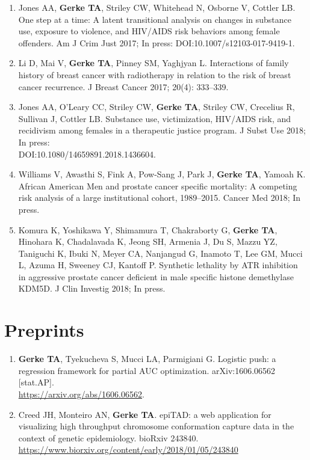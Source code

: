 \documentclass[11pt, a4paper]{article} %
\begin{document}
\begin{enumerate}[leftmargin=*]
\item{} Jones AA, {\bf Gerke TA}, Striley CW, Whitehead N, Osborne V, Cottler LB. One step at a time: A latent transitional analysis on changes in substance use, exposure to violence, and HIV/AIDS risk behaviors among female offenders. Am J Crim Just 2017; In press: DOI:10.1007/s12103-017-9419-1.

\item{} Li D, Mai V, {\bf Gerke TA}, Pinney SM, Yaghjyan L. Interactions of family history of breast cancer with radiotherapy in relation to the risk of breast cancer recurrence. J Breast Cancer 2017; 20(4): 333--339.

\item{} Jones AA, O'Leary CC, Striley CW, {\bf Gerke TA}, Striley CW, Crecelius R, Sullivan J, Cottler LB. Substance use, victimization, HIV/AIDS risk, and recidivism among females in a therapeutic justice program. J Subst Use 2018; In press:\\DOI:10.1080/14659891.2018.1436604.

\item{} Williams V, Awasthi S, Fink A, Pow-Sang J, Park J, {\bf Gerke TA}, Yamoah K. African American Men and prostate cancer specific mortality: A competing risk analysis of a large institutional cohort, 1989--2015. Cancer Med 2018; In press. 

\item{} Komura K, Yoshikawa Y, Shimamura T, Chakraborty G, {\bf Gerke TA}, Hinohara K, Chadalavada K, Jeong SH,  Armenia J, Du S, Mazzu YZ, Taniguchi K, Ibuki N, Meyer CA, Nanjangud G, Inamoto T, Lee GM, Mucci L, Azuma H, Sweeney CJ, Kantoff P. Synthetic lethality by ATR inhibition in aggressive prostate cancer deficient in male specific histone demethylase KDM5D. J Clin Investig 2018; In press. 
\end{enumerate}

\section*{Preprints}
\begin{enumerate}[leftmargin=*]
\item{} {\bf Gerke TA}, Tyekucheva S, Mucci LA, Parmigiani G. Logistic push: a regression framework for partial AUC optimization. arXiv:1606.06562 [stat.AP].\\\href{https://arxiv.org/abs/1606.06562}{https://arxiv.org/abs/1606.06562}.

\item{} Creed JH, Monteiro AN, {\bf Gerke TA}. epiTAD: a web application for visualizing high throughput chromosome conformation capture data in the context of genetic epidemiology. bioRxiv 243840. \href{https://www.biorxiv.org/content/early/2018/01/05/243840}{https://www.biorxiv.org/content/early/2018/01/05/243840}
\end{enumerate}
\end{document}
